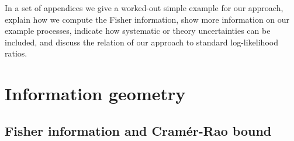 In a set of appendices we give a worked-out simple example for our
approach, explain how we compute the Fisher information, show more
information on our example processes, indicate how systematic or
theory uncertainties can be included, and discuss the relation of our
approach to standard log-likelihood ratios.



\section{Information geometry}
\label{sec:information_formalism}

\subsection{Fisher information and Cram\'er-Rao bound}
\label{sec:information_formalism_information}

